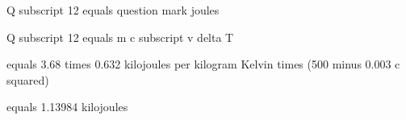 Q subscript 12 equals question mark joules

Q subscript 12 equals m c subscript v delta T

equals 3.68 times 0.632 kilojoules per kilogram Kelvin times (500 minus 0.003 c squared)

equals 1.13984 kilojoules